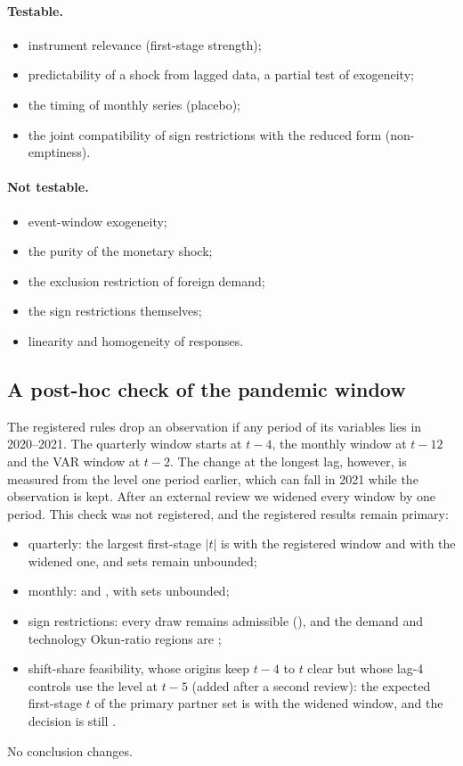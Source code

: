 \paragraph{Testable.}
\begin{itemize}
  \item instrument relevance (first-stage strength);
  \item predictability of a shock from lagged data, a partial test of exogeneity;
  \item the timing of monthly series (placebo);
  \item the joint compatibility of sign restrictions with the reduced form (non-emptiness).
\end{itemize}

\paragraph{Not testable.}
\begin{itemize}
  \item event-window exogeneity;
  \item the purity of the monetary shock;
  \item the exclusion restriction of foreign demand;
  \item the sign restrictions themselves;
  \item linearity and homogeneity of responses.
\end{itemize}

\subsection{A post-hoc check of the pandemic window}

The registered rules drop an observation if any period of its variables lies in
2020--2021. The quarterly window starts at $t-4$, the monthly window at $t-12$ and the VAR
window at $t-2$. The change at the longest lag, however, is measured from the level one
period earlier, which can fall in 2021 while the observation is kept. After an external
review we widened every window by one period. This check was not registered, and the
registered results remain primary:
\begin{itemize}
  \item quarterly: the largest first-stage $|t|$ is  with the registered
    window and  with the widened one, and  sets
    remain unbounded;
  \item monthly:  and , with  sets
    unbounded;
  \item sign restrictions: every draw remains admissible (), and the
    demand and technology Okun-ratio regions are ;
  \item shift-share feasibility, whose origins keep $t-4$ to $t$ clear but whose lag-4
    controls use the level at $t-5$ (added after a second review): the expected
    first-stage $t$ of the primary partner set is  with the widened window,
    and the decision is still .
\end{itemize}
No conclusion changes.

